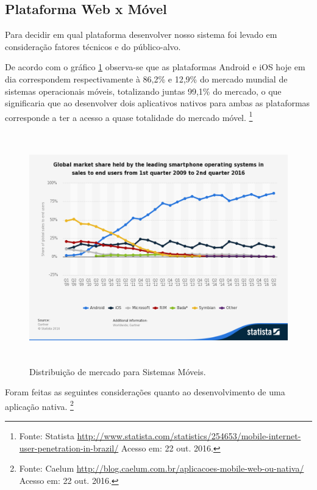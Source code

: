 \subsection{Plataforma Web x Móvel}
\par Para decidir em qual plataforma desenvolver nosso sistema foi levado em consideração fatores técnicos e do público-alvo.
\par De acordo com o gráfico \ref{fig:global_market_sharing} observa-se que as plataformas Android e iOS hoje em dia correspondem respectivamente à 86,2\% e 12,9\% do mercado mundial de sistemas operacionais móveis, totalizando juntas 99,1\% do mercado, o que significaria que ao desenvolver dois aplicativos nativos para ambas as plataformas corresponde a ter a acesso a quase totalidade do mercado móvel. \footnote{Fonte: Statista \url{http://www.statista.com/statistics/254653/mobile-internet-user-penetration-in-brazil/} Acesso em: 22 out. 2016.}
\begin{figure}[htb]
\centering
\includegraphics[height=10cm]{figuras/global_market_sharing}
\caption{\label{fig:global_market_sharing} Distribuição de mercado para Sistemas Móveis.}
\end{figure}
\par Foram feitas as seguintes considerações quanto ao desenvolvimento de uma aplicação nativa. \footnote{Fonte: Caelum \url{http://blog.caelum.com.br/aplicacoes-mobile-web-ou-nativa/} Acesso em: 22 out. 2016.}
